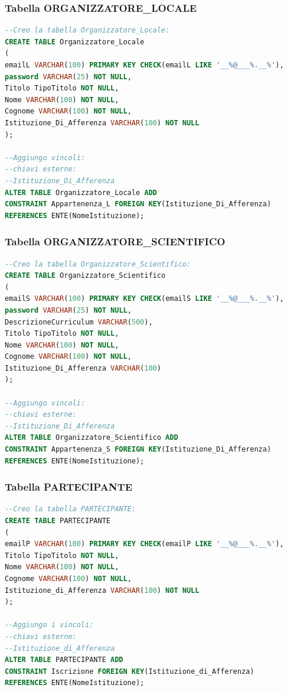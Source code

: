 \documentclass[a4page]{article}
\begin{document}
\subsubsection{Tabella ORGANIZZATORE\_LOCALE}
\begin{lstlisting}[language=SQL,
        deletekeywords={IDENTITY,INT},
        morekeywords={clustered},    
        framesep=10pt,
        framextopmargin=10pt]
--Creo la tabella Organizzatore_Locale: 
CREATE TABLE Organizzatore_Locale
(
emailL VARCHAR(100) PRIMARY KEY CHECK(emailL LIKE '__%@___%.__%'),
password VARCHAR(25) NOT NULL,
Titolo TipoTitolo NOT NULL,
Nome VARCHAR(100) NOT NULL,
Cognome VARCHAR(100) NOT NULL,
Istituzione_Di_Afferenza VARCHAR(100) NOT NULL          
);

--Aggiungo vincoli:
--chiavi esterne:
--Istituzione_Di_Afferenza
ALTER TABLE Organizzatore_Locale ADD
CONSTRAINT Appartenenza_L FOREIGN KEY(Istituzione_Di_Afferenza)
REFERENCES ENTE(NomeIstituzione);        

\end{lstlisting}
\subsubsection{Tabella ORGANIZZATORE\_SCIENTIFICO}
\begin{lstlisting}[language=SQL,
        deletekeywords={IDENTITY,INT},
        morekeywords={clustered},    
        framesep=10pt,
        framextopmargin=10pt]
--Creo la tabella Organizzatore_Scientifico: 
CREATE TABLE Organizzatore_Scientifico
(
emailS VARCHAR(100) PRIMARY KEY CHECK(emailS LIKE '__%@___%.__%'),
password VARCHAR(25) NOT NULL,
DescrizioneCurriculum VARCHAR(500),
Titolo TipoTitolo NOT NULL,
Nome VARCHAR(100) NOT NULL,
Cognome VARCHAR(100) NOT NULL,
Istituzione_Di_Afferenza VARCHAR(100)
);

--Aggiungo vincoli:
--chiavi esterne:
--Istituzione_Di_Afferenza
ALTER TABLE Organizzatore_Scientifico ADD
CONSTRAINT Appartenenza_S FOREIGN KEY(Istituzione_Di_Afferenza)
REFERENCES ENTE(NomeIstituzione);        

\end{lstlisting}

\subsubsection{Tabella PARTECIPANTE}
\begin{lstlisting}[language=SQL,
        deletekeywords={IDENTITY,INT},
        morekeywords={clustered},    
        framesep=10pt,
        framextopmargin=10pt]
--Creo la tabella PARTECIPANTE: 
CREATE TABLE PARTECIPANTE
(
emailP VARCHAR(100) PRIMARY KEY CHECK(emailP LIKE '__%@___%.__%'),
Titolo TipoTitolo NOT NULL,
Nome VARCHAR(100) NOT NULL,
Cognome VARCHAR(100) NOT NULL,
Istituzione_di_Afferenza VARCHAR(100) NOT NULL
);

--Aggiungo i vincoli:
--chiavi esterne:
--Istituzione_di_Afferenza
ALTER TABLE PARTECIPANTE ADD
CONSTRAINT Iscrizione FOREIGN KEY(Istituzione_di_Afferenza)
REFERENCES ENTE(NomeIstituzione);        

\end{lstlisting}
\end{document}

